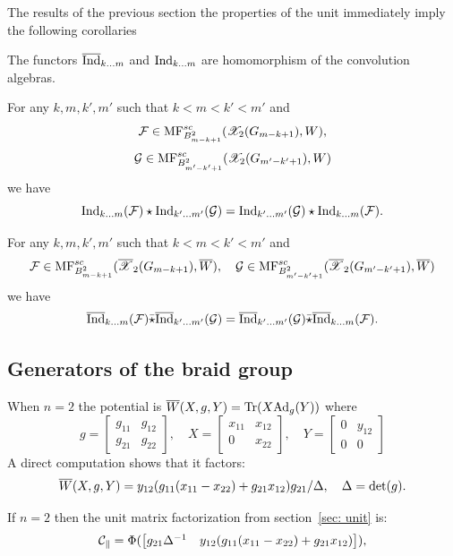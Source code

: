 The results of the previous section  the properties of the unit immediately imply the following corollaries


\begin{corollary}\label{cor: ind} The functors $\overline{\mathrm{Ind}}_{k\dots m}$ and $\mathrm{Ind}_{k\dots m}$ are homomorphism of the convolution algebras.
\end{corollary}

\begin{corollary}\label{cor: commute non red}For any $k,m,k',m'$ such that $k<m<k'<m'$ and
 \[\mathcal{F}\in \mathrm{MF}^{sc}_{B_{m-k+1}^2}(\mathscr{X}_2(G_{m-k+1}),W),\]
\[\mathcal{G}\in \mathrm{MF}^{sc}_{ B_{m'-k'+1}^2}(\mathscr{X}_2(G_{m'-k'+1}),W)\] we have
$$ \mathrm{Ind}_{k\dots m} (\mathcal{F})\star\mathrm{Ind}_{k'\dots m'} (\mathcal{G})=\mathrm{Ind}_{k'\dots m'} (\mathcal{G})\star\mathrm{Ind}_{k\dots m} (\mathcal{F}).$$
\end{corollary}


\begin{corollary}\label{cor: commute}For any $k,m,k',m'$ such that $k<m<k'<m'$ and
 $$\mathcal{F}\in \mathrm{MF}^{sc}_{ B_{m-k+1}^2}(\overline{\mathscr{X}}_2(G_{m-k+1}),\overline{W}),\quad
\mathcal{G}\in \mathrm{MF}^{sc}_{ B_{m'-k'+1}^2}(\overline{\mathscr{X}}_2(G_{m'-k'+1}),\overline{W})$$ we have
$$ \overline{\mathrm{Ind}}_{k\dots m} (\mathcal{F})\bar{\star}\overline{\mathrm{Ind}}_{k'\dots m'} (\mathcal{G})=\overline{\mathrm{Ind}}_{k'\dots m'} (\mathcal{G})\bar{\star}\overline{\mathrm{Ind}}_{k\dots m} (\mathcal{F}).$$
\end{corollary}



\subsection{Generators of the braid group}\label{ssec:gens}

When $n=2$ the potential is $\overline{W}(X,g,Y)=\mathop{{\rm Tr}}\nolimits(X{\rm Ad}_g(Y))$ 
where
$$ g=\begin{bmatrix} g_{11}&g_{12}\\ g_{21}& g_{22}\end{bmatrix},\quad X=\begin{bmatrix} x_{11}&x_{12}\\ 0& x_{22}\end{bmatrix},\quad Y=\begin{bmatrix} 0& y_{12}\\0&0\end{bmatrix}$$
A direct computation shows that it factors:
$$\overline{W}(X,g,Y)=y_{12}(g_{11}(x_{11}-x_{22})+g_{21}x_{12})g_{21}/\Delta,\quad \Delta=\det(g).$$

If \(n=2\) then the unit matrix factorization from section~\ref{sec: unit} is:
\[ \mathcal{C}_{\parallel}=\Phi(\begin{bmatrix}g_{21}\Delta^{-1}& y_{12}(g_{11}(x_{11}-x_{22})+g_{21}x_{12})\end{bmatrix}),\]

